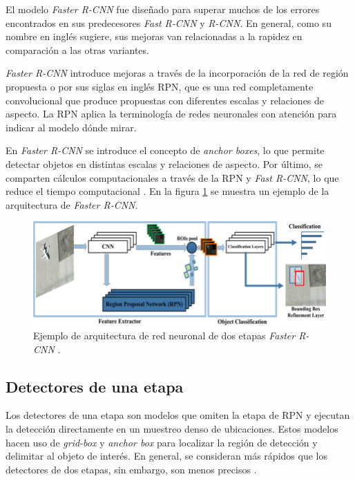 El modelo \textit{Faster R-CNN} fue diseñado para superar muchos de los errores encontrados en sus predecesores \textit{Fast R-CNN} y \textit{R-CNN}. En general, como su nombre en inglés sugiere, sus mejoras van relacionadas a la rapidez en comparación a las otras variantes.

\textit{Faster R-CNN} introduce mejoras a través de la incorporación de la red de región propuesta o por sus siglas en inglés RPN, que es una red completamente convolucional que produce propuestas con diferentes escalas y relaciones de aspecto. La RPN aplica la terminología de redes neuronales con atención para indicar al modelo dónde mirar.

En \textit{Faster R-CNN} se introduce el concepto de \textit{anchor boxes}, lo que permite detectar objetos en distintas escalas y relaciones de aspecto. Por último, se comparten cálculos computacionales a través de la RPN y \textit{Fast R-CNN}, lo que reduce el tiempo computacional \cite{ARTICLE:9}. En la figura \ref{fig:Faster-rcnn} se muestra un ejemplo de la arquitectura de \textit{Faster R-CNN}.

\begin{figure}[ht]
	\centering
	\includegraphics[scale=1.3]{./Figures/Faster-rcnn.png}
	\caption{Ejemplo de arquitectura de red neuronal de dos etapas \textit{Faster R-CNN} \cite{ARTICLE:11}.}
	\label{fig:Faster-rcnn}
\end{figure}

\subsection{Detectores de una etapa}

Los detectores de una etapa son modelos que omiten la etapa de RPN y ejecutan la detección directamente en un muestreo denso de ubicaciones. Estos modelos hacen uso de \textit{grid-box} y \textit{anchor box} para localizar la región de detección y delimitar al objeto de interés. En general, se consideran más rápidos que los detectores de dos etapas, sin embargo, son menos precisos \cite{ARTICLE:12}.

